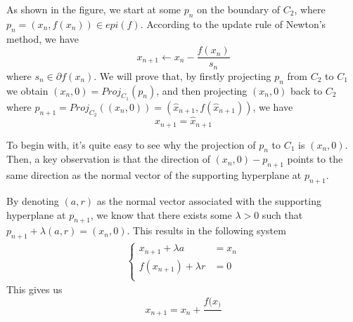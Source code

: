 As shown in the figure, we start at some $p_n$ on the boundary of $C_2$, where $p_n = (x_n, f(x_n)) \in epi(f)$. According to the update rule of Newton's method, we have
\begin{equation*}
    x_{n+1} \leftarrow x_n - \frac{f(x_n)}{s_n}
\end{equation*}
where $s_n \in \partial f(x_n)$. We will prove that, by firstly projecting $p_n$ from $C_2$ to $C_1$ we obtain $(x_n, 0) = Proj_{C_1}(p_n)$, and then projecting $(x_n, 0)$ back to $C_2$ where $p_{n+1} = Proj_{C_2}((x_n, 0)) = (\hat{x}_{n+1}, f(\hat{x}_{n+1}))$, we have 
\begin{equation*}
    x_{n+1} = \hat{x}_{n+1}
\end{equation*}

To begin with, it's quite easy to see why the projection of $p_n$ to $C_1$ is $(x_n, 0)$. Then, a key observation is that the direction of $(x_n, 0) - p_{n+1}$ points to the same direction as the normal vector of the supporting hyperplane at $p_{n+1}$. 

By denoting $(a, r)$ as the normal vector associated with the supporting hyperplane at $p_{n+1}$, we know that there exists some $\lambda > 0$ such that $p_{n+1} + \lambda (a, r) = (x_n, 0)$. This results in the following system
\begin{align*}
    \left\{
    \begin{array}{ll}
        x_{n+1} + \lambda a &= x_n \\
        f(x_{n+1}) + \lambda r &= 0 \\
    \end{array}
    \right.
\end{align*}
This gives us
\begin{equation*}
    x_{n+1} = x_n + \frac{f(x_)}{}
\end{equation*}